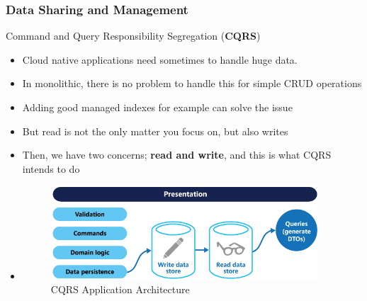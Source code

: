 \documentclass{beamer}
\begin{document}
		\begin{frame}
		\frametitle{Data Sharing and Management}
			Command and Query Responsibility Segregation (\textbf{CQRS})  
			\begin{itemize}
				\item<1->[] \small{Cloud native applications need sometimes to handle huge data.}
				\vspace{1mm}
				\item<1-> \scriptsize{In monolithic, there is no problem to handle this for simple CRUD operations}
				\item<1-> \scriptsize{Adding good managed indexes for example can solve the issue}
				\item<1-> \scriptsize{But read is not the only matter you focus on, but also writes}
				\item<1-> \scriptsize{Then, we have two concerns; \textbf{read and write}, and this is what CQRS intends to do}
				\item<1->[]
					\begin{figure}[h]
						\includegraphics[width=100mm,height= 35mm, scale=1]{img/cqrs-separate-stores.png}
						\caption{CQRS Application Architecture}
					\end{figure}
			\end{itemize}
		\end{frame}
	
\end{document}
